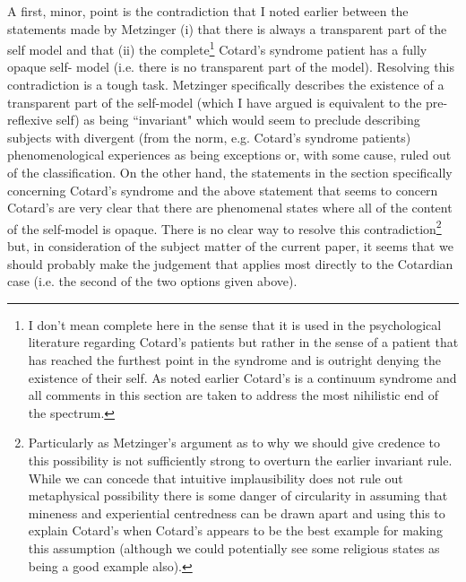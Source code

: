 A first, minor, point is the contradiction that I noted earlier between the statements made by Metzinger (i) that there is always a transparent part of the self model and that (ii) the complete\footnote{I don't mean complete here in the sense that it is used in the psychological literature regarding Cotard's patients but rather in the sense of a patient that has reached the furthest point in the syndrome and is outright denying the existence of their self. As noted earlier Cotard's is a continuum syndrome and all comments in this section are taken to address the most nihilistic end of the spectrum.} Cotard's syndrome patient has a fully opaque self- model (i.e. there is no transparent part of the model). Resolving this contradiction is a tough task. Metzinger specifically describes the existence of a transparent part of the self-model (which I have argued is equivalent to the pre-reflexive self) as being ``invariant" which would seem to preclude describing subjects with divergent (from the norm, e.g. Cotard's syndrome patients) phenomenological experiences as being exceptions or, with some cause, ruled out of the classification. On the other hand, the statements in the section specifically concerning Cotard's syndrome and the above statement that seems to concern Cotard's are very clear that there are phenomenal states where all of the content of the self-model is opaque. There is no clear way to resolve this contradiction\footnote{Particularly as Metzinger's argument as to why we should give credence to this possibility is not sufficiently strong to overturn the earlier invariant rule. While we can concede that intuitive implausibility does not rule out metaphysical possibility there is some danger of circularity in assuming that mineness and experiential centredness can be drawn apart and using this to explain Cotard's when Cotard's appears to be the best example for making this assumption (although we could potentially see some religious states as being a good example also).} but, in consideration of the subject matter of the current paper, it seems that we should probably make the judgement that applies most directly to the Cotardian case (i.e. the second of the two options given above).

